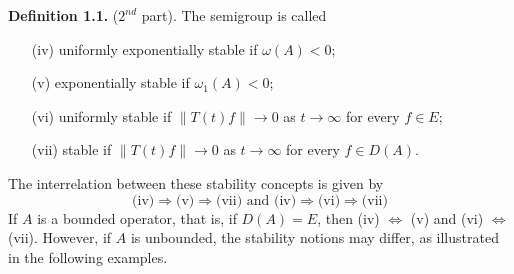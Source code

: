 \bigskip
\noindent
{\bf Definition 1.1.} ($2^{nd}$ part). 
The semigroup is called
\begin{enumerate}
\item[(iv)] uniformly exponentially stable if $\omega(A) < 0$;
\item[(v)] exponentially stable if $\omega_{1}(A) < 0$;
\item[(vi)] uniformly stable if $\|T(t)f\| \to 0$ as $t \to \infty$ for every $f \in E$;
\item[(vii)] stable if $\|T(t)f\| \to 0$ as $t \to \infty$ for every $f \in D(A)$.
\end{enumerate}
\bigskip
\noindent
The interrelation between these stability concepts is given by
\[
\text{(iv)} \Rightarrow \text{(v)} \Rightarrow \text{(vii)} \text{ and } \text{(iv)} \Rightarrow \text{(vi)} \Rightarrow \text{(vii)}
\]
If $A$ is a bounded operator, that is, if $D(A) = E$, then (iv) $\Leftrightarrow$ (v) and (vi) $\Leftrightarrow$ (vii).
However, if $A$ is unbounded, the stability notions may differ, as illustrated in the following examples.
